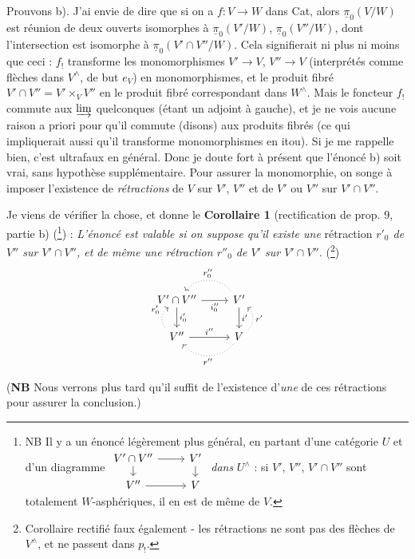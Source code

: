 \documentclass[11pt]{article}
\newcommand{\printedpage}[1]{\marginpar{\footnotesize p.~#1}}
\newcommand{\msp}[1]{\marginpar{\footnotesize [#1]}}
\newcommand{\upi}{\underline{\pi}}
\begin{document}
Prouvons b). J'ai envie de dire que si on a $f : V \longrightarrow W$ dans Cat, alors $\upi_0(V/W)$ est réunion de deux ouverts isomorphes à $\upi_0(V'/W)$, $\upi_0(V''/W)$, dont l'intersection est isomorphe à $\upi_0(V'\cap V''/W)$. Cela signifierait ni plus ni
\msp{page 98}
moins que ceci : $f_!$ transforme les monomorphismes $V' \longrightarrow V$, $V'' \longrightarrow V$ (interprétés comme flèches dans $V^\wedge$, de but $e_V$) en monomorphismes, et le produit fibré $V'\cap V'' = V' \times_V V''$ en le produit fibré correspondant dans $W^\wedge$. Mais le foncteur $f_!$ commute aux $\varinjlim$ quelconques (étant un adjoint à gauche), et je ne vois aucune raison a priori pour qu'il commute (disons) aux produits fibrés (ce qui impliquerait aussi qu'il transforme monomorphismes en itou). Si je me rappelle bien, c'est ultrafaux en général. Donc je doute fort à présent que l'énoncé b) soit vrai, sans hypothèse supplémentaire. Pour assurer la monomorphie, on songe à imposer l'existence de \textit{rétractions} de $V$ sur $V'$, $V''$ et de $V'$ ou $V''$ sur $V'\cap V''$.

Je viens de vérifier la chose, et donne le
\printedpage{69}
\textbf{Corollaire 1} (rectification de prop. 9, partie b) (\footnote{NB Il y a un énoncé légèrement plus général, en partant d'une catégorie $U$ et d'un diagramme
$\begin{tikzcd}[ampersand replacement=\&, row sep=small]
V'\cap V'' \arrow[r] \arrow[d] \& V' \arrow[d] \\
V'' \arrow[r] \& V
\end{tikzcd}$
\textit{dans} $U^\wedge$ : si $V'$, $V''$, $V'\cap V''$ sont totalement $W$-asphériques, il en est de même de $V$.}) : \textit{L'énoncé est valable si on suppose qu'il existe une} rétraction \textit{$r'_0$ de $V''$ sur $V'\cap V''$, et de même une rétraction $r''_0$ de $V'$ sur $V'\cap V''$.} (\footnote{Corollaire rectifié faux également - les rétractions ne sont pas des flèches de $V^\wedge$, et ne passent dans $p_!$.}) %
\[
\begin{tikzcd}
V'\cap V'' \arrow[r, "i''_0"'] \arrow[d, "i'_0"] & V' \arrow[d, "i'"] \arrow[l, dotted, bend right=50, "r''_0"'] \\
V'' \arrow[r, "i''"] \arrow[u, dotted, bend left=50, "r'_0"] & V \arrow[u, dotted, bend right=50, "r'"'] \arrow[l, dotted, bend left=50, "r''"]
\end{tikzcd}
\]

(\textbf{NB} Nous verrons plus tard qu'il suffit de l'existence d'\textit{une} de ces rétractions pour assurer la conclusion.)
\end{document}

